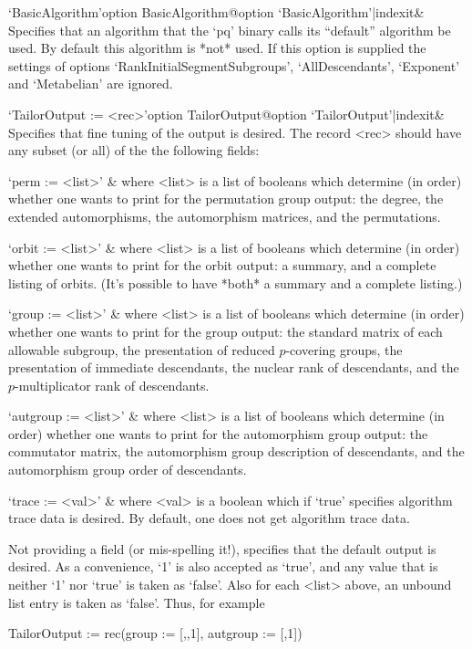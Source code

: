 \>`BasicAlgorithm'{option BasicAlgorithm}@{option `BasicAlgorithm'|indexit}&
Specifies that an algorithm that the `pq' binary  calls  its  ``default''
algorithm be used. By default this  algorithm  is  *not*  used.  If  this
option is supplied the settings of options `RankInitialSegmentSubgroups',
`AllDescendants', `Exponent' and `Metabelian' are ignored.

\>`TailorOutput := <rec>'{option TailorOutput}@{option `TailorOutput'|indexit}&
Specifies that fine tuning of the output is  desired.  The  record  <rec>
should have any subset (or all) of the the following fields:

\quad`perm := <list>' &
where <list> is a list of booleans which determine (in order) whether one
wants to print for the permutation group output: the degree, the extended
automorphisms, the automorphism matrices, and the permutations.

\quad`orbit := <list>' &
where <list> is a list of booleans which determine (in order) whether one
wants to print for the orbit output: a summary, and a complete listing of
orbits. (It's possible to have *both* a summary and a complete listing.)

\quad`group := <list>' &
where <list> is a list of booleans which determine (in order) whether one
wants to print  for  the  group  output:  the  standard  matrix  of  each
allowable subgroup, the presentation of reduced $p$-covering groups,  the
presentation of immediate descendants, the nuclear rank  of  descendants,
and the $p$-multiplicator rank of descendants.

\quad`autgroup := <list>' &
where <list> is a list of booleans which determine (in order) whether one
wants to print for the automorphism group output: the commutator  matrix,
the automorphism group description of descendants, and  the  automorphism
group order of descendants.

\quad`trace := <val>' &
where <val> is a boolean which if `true' specifies algorithm  trace  data
is desired. By default, one does not get algorithm trace data.

Not providing a field (or mis-spelling it!), specifies that  the  default
output is desired. As a convenience, `1' is also accepted as `true',  and
any value that is neither `1' nor `true' is taken as  `false'.  Also  for
each <list> above, an unbound list entry is taken as `false'.  Thus,  for
example

\begintt
TailorOutput := rec(group := [,,1], autgroup := [,1])
\endtt

